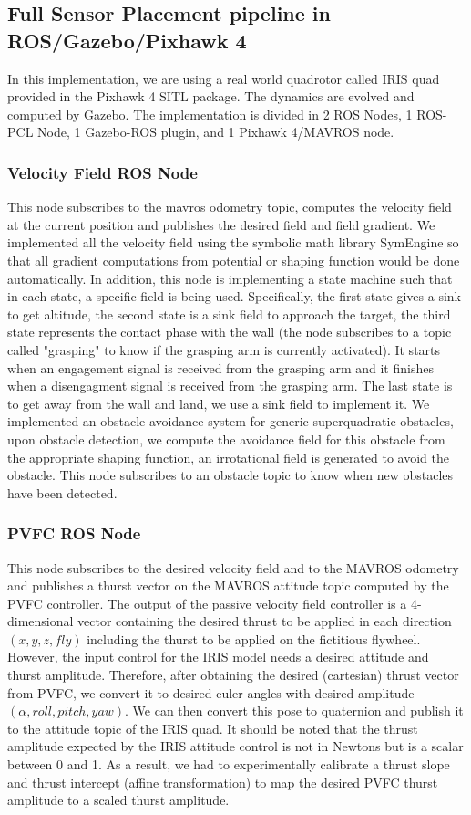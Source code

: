 \subsection{Full Sensor Placement pipeline in ROS/Gazebo/Pixhawk 4}
In this implementation, we are using a real world quadrotor called IRIS quad provided in the Pixhawk 4 SITL package. 
The dynamics are evolved and computed by Gazebo. 
The implementation is divided in 2 ROS Nodes, 1 ROS-PCL Node, 1 Gazebo-ROS plugin, and 1 Pixhawk 4/MAVROS node.
\subsubsection{Velocity Field ROS Node}
This node subscribes to the mavros odometry topic, computes the velocity field at the current position and publishes the desired field and field gradient. 
We implemented all the velocity field using the symbolic math library SymEngine so that all gradient computations from potential or shaping function would be done automatically. 
In addition, this node is implementing a state machine such that in each state, a specific field is being used.
Specifically, the first state gives a sink to get altitude, the second state is a sink field to approach the target, 
the third state represents the contact phase with the wall (the node subscribes to a topic called "grasping" to know if the grasping arm is currently activated). It starts when an engagement signal is received from the grasping arm and it finishes when a disengagment signal is received from the grasping arm. 
The last state is to get away from the wall and land, we use a sink field to implement it.
We implemented an obstacle avoidance system for generic superquadratic obstacles, upon obstacle detection, we compute the avoidance field for this obstacle from the appropriate shaping function, an irrotational field is generated to avoid the obstacle. This node subscribes to an obstacle topic to know when new obstacles have been detected. 
\subsubsection{PVFC ROS Node}
This node subscribes to the desired velocity field and to the MAVROS odometry and publishes a thurst vector on the MAVROS attitude topic computed by the PVFC controller. The output of the passive velocity field controller is a 4-dimensional vector containing the desired thrust to be applied in each direction $(x,y,z, fly)$ including the thurst to be applied on the fictitious flywheel. 
However, the input control for the IRIS model needs a desired attitude and thurst amplitude. Therefore, after obtaining the desired (cartesian) thrust vector from PVFC, we convert it to desired euler angles with desired amplitude $(\alpha, roll, pitch, yaw)$. 
We can then convert this pose to quaternion and publish it to the attitude topic of the IRIS quad.
It should be noted that the thrust amplitude expected by the IRIS attitude control is not in Newtons but is a scalar between 0 and 1. As a result, we had to experimentally calibrate a thrust slope and thrust intercept (affine transformation) to map the desired PVFC thurst amplitude to a scaled thurst amplitude. 
